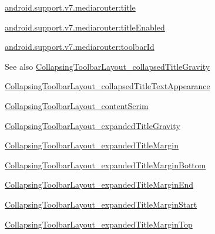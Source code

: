 {\ttfamily \hyperlink{classandroid_1_1support_1_1v7_1_1mediarouter_1_1R_1_1styleable_ab2ba0d03f6955916a430e0ac530551d2}{android.\+support.\+v7.\+mediarouter\+:title}}

{\ttfamily \hyperlink{classandroid_1_1support_1_1v7_1_1mediarouter_1_1R_1_1styleable_afd96eea83afe0af62d5c951105c47546}{android.\+support.\+v7.\+mediarouter\+:title\+Enabled}}

{\ttfamily \hyperlink{classandroid_1_1support_1_1v7_1_1mediarouter_1_1R_1_1styleable_a4dcf16bdea9427a02434b698abe1f176}{android.\+support.\+v7.\+mediarouter\+:toolbar\+Id}}

\begin{DoxySeeAlso}{See also}
\hyperlink{classandroid_1_1support_1_1v7_1_1mediarouter_1_1R_1_1styleable_a4796c2b434065ed0a5d8b8da7097611f}{Collapsing\+Toolbar\+Layout\+\_\+collapsed\+Title\+Gravity} 

\hyperlink{classandroid_1_1support_1_1v7_1_1mediarouter_1_1R_1_1styleable_a19289097d1a4df77e8a7e6951eca7f63}{Collapsing\+Toolbar\+Layout\+\_\+collapsed\+Title\+Text\+Appearance} 

\hyperlink{classandroid_1_1support_1_1v7_1_1mediarouter_1_1R_1_1styleable_a733f927a6b32c7e392024dee4d4567eb}{Collapsing\+Toolbar\+Layout\+\_\+content\+Scrim} 

\hyperlink{classandroid_1_1support_1_1v7_1_1mediarouter_1_1R_1_1styleable_ae40ceb21ca3985d085331f3239b64f89}{Collapsing\+Toolbar\+Layout\+\_\+expanded\+Title\+Gravity} 

\hyperlink{classandroid_1_1support_1_1v7_1_1mediarouter_1_1R_1_1styleable_ac9af9dc4bdced732d343d68c26940f9e}{Collapsing\+Toolbar\+Layout\+\_\+expanded\+Title\+Margin} 

\hyperlink{classandroid_1_1support_1_1v7_1_1mediarouter_1_1R_1_1styleable_ac08783d2f2f6cd0a8b8e66d9fc4f7c4c}{Collapsing\+Toolbar\+Layout\+\_\+expanded\+Title\+Margin\+Bottom} 

\hyperlink{classandroid_1_1support_1_1v7_1_1mediarouter_1_1R_1_1styleable_a99ffdbdeb16dfbadacaf7acae56a72e8}{Collapsing\+Toolbar\+Layout\+\_\+expanded\+Title\+Margin\+End} 

\hyperlink{classandroid_1_1support_1_1v7_1_1mediarouter_1_1R_1_1styleable_a59b6f64edf96c1e41a735bced54430bd}{Collapsing\+Toolbar\+Layout\+\_\+expanded\+Title\+Margin\+Start} 

\hyperlink{classandroid_1_1support_1_1v7_1_1mediarouter_1_1R_1_1styleable_ab761558efd3406c65c9f69c800bfca94}{Collapsing\+Toolbar\+Layout\+\_\+expanded\+Title\+Margin\+Top} 


\end{DoxySeeAlso}
